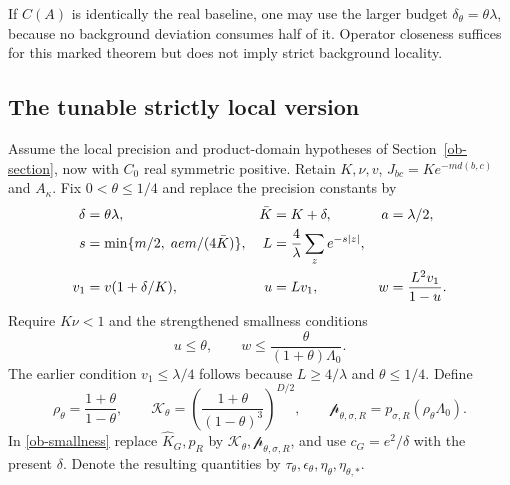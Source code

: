 \documentclass[11pt]{article}
\theoremstyle{remark}
\begin{document}
If $C(A)$ is identically the real baseline, one may use the
larger budget $\delta_\theta=\theta\lambda$, because no
background deviation consumes half of it.
Operator closeness suffices for this marked theorem but does
not imply strict background locality.

\subsection{The tunable strictly local version}

Assume the local precision and product-domain hypotheses of
Section~\ref{ob-section}, now with $C_0$ real symmetric positive.
Retain $K,\nu,v$, $J_{bc}=Ke^{-md(b,c)}$ and $A_\kappa$.
Fix $0<\theta\le1/4$ and replace the precision constants by
\begin{align}
 \delta&=\theta\lambda,& \bar K&=K+\delta,& a&=\lambda/2,
 \notag\\
 s&=\min\{m/2,\;aem/(4\bar K)\},&
 L&=\frac4\lambda\sum_z e^{-s|z|},\notag\\
 v_1&=v(1+\delta/K),&
 u&=Lv_1,& w&=\frac{L^2v_1}{1-u}.                \label{otg-precision-constants}
\end{align}
Require $K\nu<1$ and the strengthened smallness conditions
\begin{equation}\label{otg-precision-small}
 u\le\theta,\qquad
 w\le\frac{\theta}{(1+\theta)\Lambda_0}.
\end{equation}
The earlier condition $v_1\le\lambda/4$ follows because
$L\ge4/\lambda$ and $\theta\le1/4$.
Define
\begin{equation}\label{otg-strict-density-constants}
 \rho_\theta=\frac{1+\theta}{1-\theta},\qquad
 \mathcal K_\theta=
     \left(\frac{1+\theta}{(1-\theta)^3}\right)^{D/2},
 \qquad
 \mathcal p_{\theta,\sigma,R}
        =p_{\sigma,R}(\rho_\theta\Lambda_0).
\end{equation}
In \eqref{ob-smallness} replace
$\widehat K_G,\widehat p_R$ by
$\mathcal K_\theta,\mathcal p_{\theta,\sigma,R}$,
and use $c_G=e^2/\delta$ with the present $\delta$.
Denote the resulting quantities by
$\mathcal\tau_\theta,\mathcal\epsilon_\theta,
\mathcal\eta_\theta,\mathcal\eta_{\theta,*}$.
\end{document}
